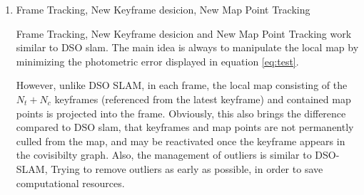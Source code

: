 \begin{enumerate}
	\item{Frame Tracking, New Keyframe desicion, New Map Point Tracking}
	
	Frame Tracking, New Keyframe desicion and New Map Point Tracking work similar to DSO slam. The main idea is always to manipulate the local map 
	by minimizing the photometric error displayed in equation \ref{eq:test}. 

	However, unlike DSO SLAM, in each frame, the local map 
	consisting of the $N_t + N_c$ keyframes (referenced from the latest keyframe) and contained map points is projected into the frame. 
	Obviously, this also brings the difference compared to DSO slam, that keyframes and map points are not permanently culled from the 
	map, and may be reactivated once the keyframe appears in the covisibilty graph. Also, the management of outliers is similar to DSO-SLAM, 
	Trying to remove outliers as early as possible, in order to save computational resources. 
	\end{enumerate}
 